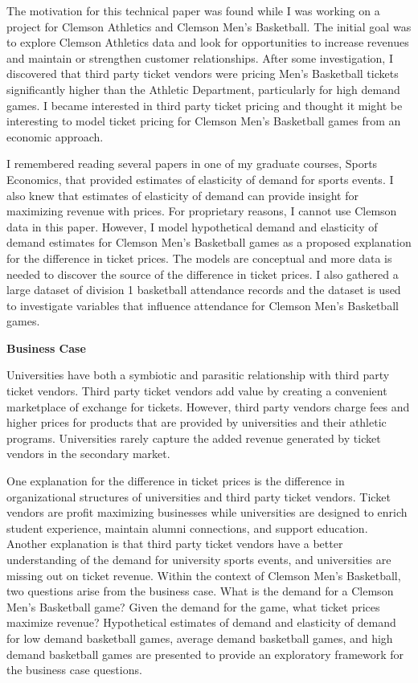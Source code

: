 \documentclass[preprint,12pt,times]{elsarticle}
\begin{document}
The motivation for this technical paper was found while I was working on a project for Clemson Athletics and Clemson Men's Basketball.  The initial goal was to explore Clemson Athletics data and look for opportunities to increase revenues and maintain or strengthen customer relationships.  After some investigation, I discovered that third party ticket vendors were pricing Men's Basketball tickets significantly higher than the Athletic Department, particularly for high demand games.  I became interested in third party ticket pricing and thought it might be interesting to model ticket pricing for Clemson Men's Basketball games from an economic approach.

I remembered reading several papers in one of my graduate courses, Sports Economics, that provided estimates of elasticity of demand for sports events.  I also knew that estimates of elasticity of demand can provide insight for maximizing revenue with prices.  For proprietary reasons, I cannot use Clemson data in this paper. However, I model hypothetical demand and elasticity of demand estimates for Clemson Men's Basketball games as a proposed explanation for the difference in ticket prices.  The models are conceptual and more data is needed to discover the source of the difference in ticket prices.  I also gathered a large dataset of division 1 basketball attendance records and the dataset is used to investigate variables that influence attendance for Clemson Men's Basketball games.

\newpage
\begin{large}
\noindent\textbf{Business Case}
\end{large}

Universities have both a symbiotic and parasitic relationship with third party ticket vendors. Third party ticket vendors add value by creating a convenient marketplace of exchange for tickets.  However, third party vendors charge fees and higher prices for products that are provided by universities and their athletic programs. Universities rarely capture the added revenue generated by ticket vendors in the secondary market.

One explanation for the difference in ticket prices is the difference in organizational structures of universities and third party ticket vendors.  Ticket vendors are profit maximizing businesses while universities are designed to enrich student experience, maintain alumni connections, and support education.  Another explanation is that third party ticket vendors have a better understanding of the demand for university sports events, and universities are missing out on ticket revenue.  Within the context of Clemson Men's Basketball, two questions arise from the business case.  What is the demand for a Clemson Men's Basketball game?  Given the demand for the game, what ticket prices maximize revenue?  Hypothetical estimates of demand and elasticity of demand for low demand basketball games, average demand basketball games, and high demand basketball games are presented to provide an exploratory framework for the business case questions.\\
\end{document}
